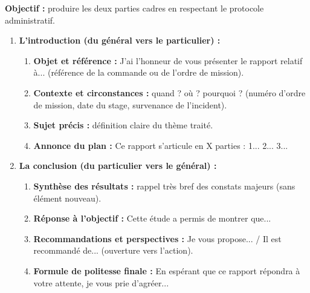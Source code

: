\documentclass[11pt]{article}
\begin{document}
\begin{methode}
    \textbf{Objectif :} produire les deux parties cadres en respectant le protocole administratif.
    \begin{enumerate}
        \item \textbf{L'introduction (du général vers le particulier) :}
        \begin{enumerate}
            \item \textbf{Objet et référence :} \og J'ai l'honneur de vous présenter le rapport relatif à...\fg{} (référence de la commande ou de l'ordre de mission).
            \item \textbf{Contexte et circonstances :} quand ? où ? pourquoi ? (numéro d'ordre de mission, date du stage, survenance de l'incident).
            \item \textbf{Sujet précis :} définition claire du thème traité.
            \item \textbf{Annonce du plan :} \og Ce rapport s'articule en X parties : 1... 2... 3...\fg
        \end{enumerate}
        \item \textbf{La conclusion (du particulier vers le général) :}
        \begin{enumerate}
            \item \textbf{Synthèse des résultats :} rappel très bref des constats majeurs (sans élément nouveau).
            \item \textbf{Réponse à l'objectif :} \og Cette étude a permis de montrer que...\fg
            \item \textbf{Recommandations et perspectives :} \og Je vous propose... / Il est recommandé de...\fg{} (ouverture vers l'action).
            \item \textbf{Formule de politesse finale :} \og En espérant que ce rapport répondra à votre attente, je vous prie d'agréer...\fg
        \end{enumerate}
    \end{enumerate}
\end{methode}
\end{document}
